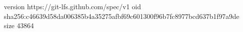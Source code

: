 version https://git-lfs.github.com/spec/v1
oid sha256:c46639d58da006385b4a35275afbf69c601300f96b7fc8977bcd637b1f97a9de
size 43864
